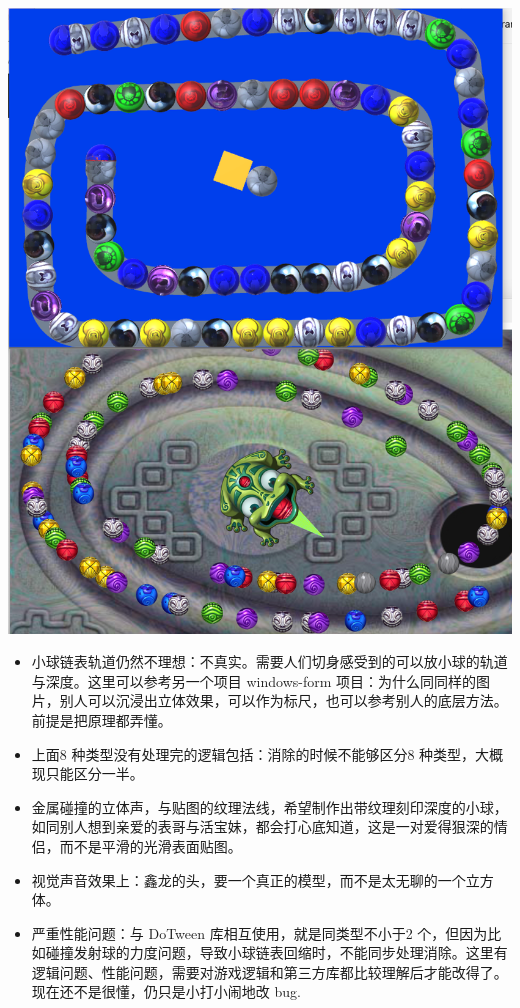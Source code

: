 \documentclass[9pt, b5paper]{article}
\begin{document}
\includegraphics[width=.9\linewidth]{./pic/readme_20230323_185513.png}
\begin{itemize}
\item 小球链表轨道仍然不理想：不真实。需要人们切身感受到的可以放小球的轨道与深度。这里可以参考另一个项目 windows-form 项目：为什么同同样的图片，别人可以沉浸出立体效果，可以作为标尺，也可以参考别人的底层方法。前提是把原理都弄懂。
\item 上面8 种类型没有处理完的逻辑包括：消除的时候不能够区分8 种类型，大概现只能区分一半。
\item 金属碰撞的立体声，与贴图的纹理法线，希望制作出带纹理刻印深度的小球，如同别人想到亲爱的表哥与活宝妹，都会打心底知道，这是一对爱得狠深的情侣，而不是平滑的光滑表面贴图。
\item 视觉声音效果上：鑫龙的头，要一个真正的模型，而不是太无聊的一个立方体。
\item 严重性能问题：与 DoTween 库相互使用，就是同类型不小于2 个，但因为比如碰撞发射球的力度问题，导致小球链表回缩时，不能同步处理消除。这里有逻辑问题、性能问题，需要对游戏逻辑和第三方库都比较理解后才能改得了。现在还不是很懂，仍只是小打小闹地改 bug.
\end{itemize}
\end{document}
